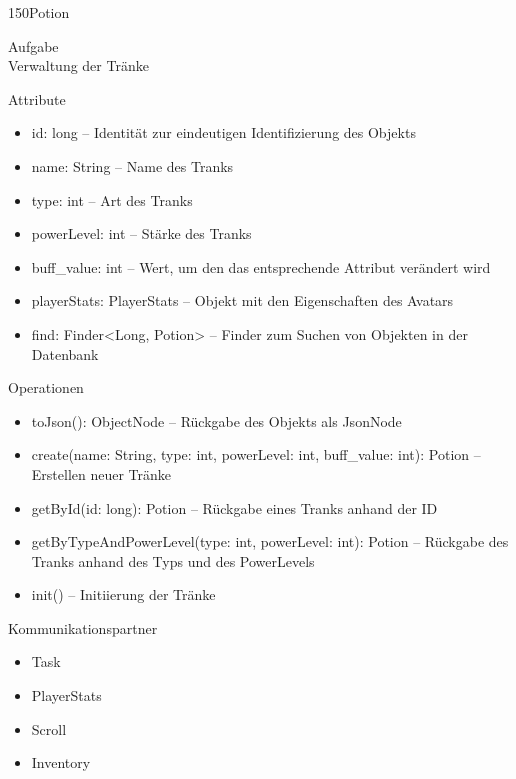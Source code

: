 \newpage
\begin{class}{150}{Potion}
\item[Aufgabe]~\\
Verwaltung der Tränke
\item[Attribute]~\\
\begin{itemize}
\item id: long -- Identität zur eindeutigen Identifizierung des Objekts
\item name: String -- Name des Tranks
\item type: int -- Art des Tranks
\item powerLevel: int -- Stärke des Tranks
\item buff\_value: int -- Wert, um den das entsprechende Attribut verändert wird
\item playerStats: PlayerStats -- Objekt mit den Eigenschaften des Avatars
\item find: Finder<Long, Potion> -- Finder zum Suchen von Objekten in der Datenbank
\end{itemize}
\item[Operationen]~\\
\begin{itemize}
\item toJson(): ObjectNode -- Rückgabe des Objekts als JsonNode
\item create(name: String, type: int, powerLevel: int, buff\_value: int): Potion -- Erstellen neuer Tränke
\item getById(id: long): Potion -- Rückgabe eines Tranks anhand der ID
\item getByTypeAndPowerLevel(type: int, powerLevel: int): Potion -- Rückgabe des Tranks anhand des Typs und des PowerLevels
\item init() -- Initiierung der Tränke
\end{itemize}
\item[Kommunikationspartner]~\\
\begin{itemize}
\item Task
\item PlayerStats
\item Scroll
\item Inventory
\end{itemize}
\end{class}

